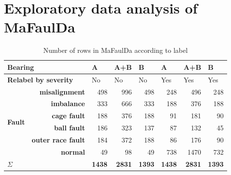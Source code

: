 \section{Exploratory data analysis of MaFaulDa}
\begin{table}[h]
\renewcommand{\arraystretch}{1.2}
\centering
\begin{tabular}{|lr|r|r|r|r|r|r|}
\hline
\multicolumn{2}{|l|}{\textbf{Bearing}}                                            & \multicolumn{1}{l|}{A}  & \multicolumn{1}{l|}{A+B} & \multicolumn{1}{l|}{B}  & \multicolumn{1}{l|}{A}   & \multicolumn{1}{l|}{A+B} & \multicolumn{1}{l|}{B}   \\ \hline
\multicolumn{2}{|l|}{\textbf{Relabel by severity}}                                & \multicolumn{1}{l|}{No} & \multicolumn{1}{l|}{No}  & \multicolumn{1}{l|}{No} & \multicolumn{1}{l|}{Yes} & \multicolumn{1}{l|}{Yes} & \multicolumn{1}{l|}{Yes} \\ \hline
\multicolumn{1}{|l|}{\multirow{6}{*}{\textbf{Fault}}} & \textbf{misalignment}     & 498                     & 996                      & 498                     & 248                      & 496                      & 248                      \\ \cline{2-8} 
\multicolumn{1}{|l|}{}                                & \textbf{imbalance}        & 333                     & 666                      & 333                     & 188                      & 376                      & 188                      \\ \cline{2-8} 
\multicolumn{1}{|l|}{}                                & \textbf{cage fault}       & 188                     & 376                      & 188                     & 91                       & 181                      & 90                       \\ \cline{2-8} 
\multicolumn{1}{|l|}{}                                & \textbf{ball fault}       & 186                     & 323                      & 137                     & 87                       & 132                      & 45                       \\ \cline{2-8} 
\multicolumn{1}{|l|}{}                                & \textbf{outer race fault} & 184                     & 372                      & 188                     & 86                       & 176                      & 90                       \\ \cline{2-8} 
\multicolumn{1}{|l|}{}                                & \textbf{normal}           & 49                      & 98                       & 49                      & 738                      & 1470                     & 732                      \\ \hline
\multicolumn{2}{|l|}{$\Sigma$}                                                    & \textbf{1438}           & \textbf{2831}            & \textbf{1393}           & \textbf{1438}            & \textbf{2831}            & \textbf{1393}            \\ \hline
\end{tabular}
\caption{Number of rows in MaFaulDa according to label}
\end{table}

